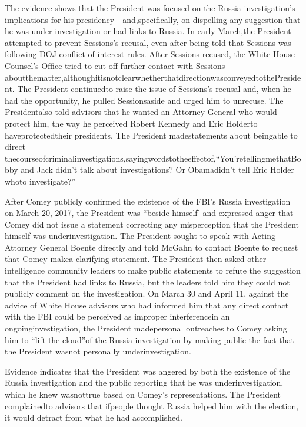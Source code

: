 The evidence shows that the President was focused on the Russia investigation’s implications for his presidency—and,specifically, on dispelling any suggestion that he was under investigation or had links to Russia.
In early March,the President attempted to prevent Sessions’s recusal, even after being told that Sessions was following DOJ conflict-of-interest rules.
After Sessions recused, the White House Counsel’s Office tried to cut off further contact with Sessions aboutthematter,althoughitisnotclearwhetherthatdirectionwasconveyedtothePresident.
The President continuedto raise the issue of Sessions’s recusal and, when he had the opportunity, he pulled Sessionsaside and urged him to unrecuse.
The Presidentalso told advisors that he wanted an Attorney General who would protect him, the way he perceived Robert Kennedy and Eric Holderto haveprotectedtheir presidents.
The President madestatements about beingable to direct thecourseofcriminalinvestigations,sayingwordstotheeffectof,“You’retellingmethatBobby and Jack didn’t talk about investigations?
Or Obamadidn’t tell Eric Holder whoto investigate?”

After Comey publicly confirmed the existence of the FBI’s Russia investigation on March 20, 2017, the President was “beside himself’ and expressed anger that Comey did not issue a statement correcting any misperception that the President himself was underinvestigation.
The President sought to speak with Acting Attorney General Boente directly and told McGahn to contact Boente to request that Comey makea clarifying statement.
The President then asked other intelligence community leaders to make public statements to refute the suggestion that the President had links to Russia, but the leaders told him they could not publicly comment on the investigation.
On March 30 and April 11, against the advice of White House advisors who had informed him that any direct contact with the FBI could be perceived as improper interferencein an ongoinginvestigation, the President madepersonal outreaches to Comey asking him to “lift the cloud”of the Russia investigation by making public the fact that the President wasnot personally underinvestigation.

Evidence indicates that the President was angered by both the existence of the Russia investigation and the public reporting that he was underinvestigation, which he knew wasnottrue based on Comey’s representations. The President complainedto advisors that ifpeople thought Russia helped him with the election, it would detract from what he had accomplished.

